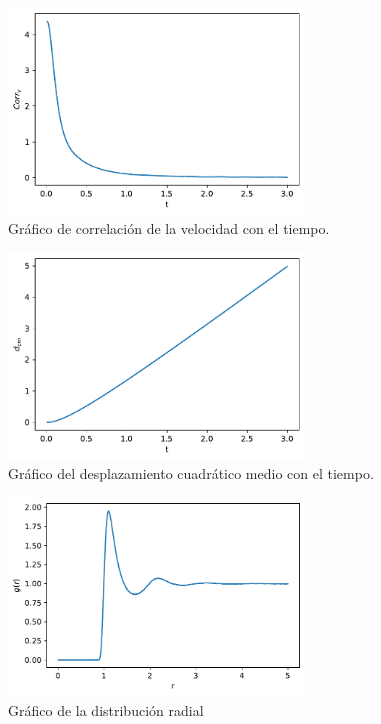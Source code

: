 \documentclass[11pt]{article} %
\begin{document}
\begin{figure}[h!] \centering
	\includegraphics[width=0.7\textwidth]{../../Graficas/Corr_vel.pdf}
	\caption{Gráfico de correlación de la velocidad con el tiempo.}
\end{figure}
\begin{figure}[h!] \centering
	\includegraphics[width=0.7\textwidth]{../../Graficas/dcm2.pdf}
	\caption{Gráfico del desplazamiento cuadrático medio con el tiempo.}
\end{figure}
\begin{figure}[h!] \centering
	\includegraphics[width=0.7\textwidth]{../../Graficas/gr.pdf}
	\caption{Gráfico de la distribución radial}
\end{figure}
	


	
	
\end{document}
